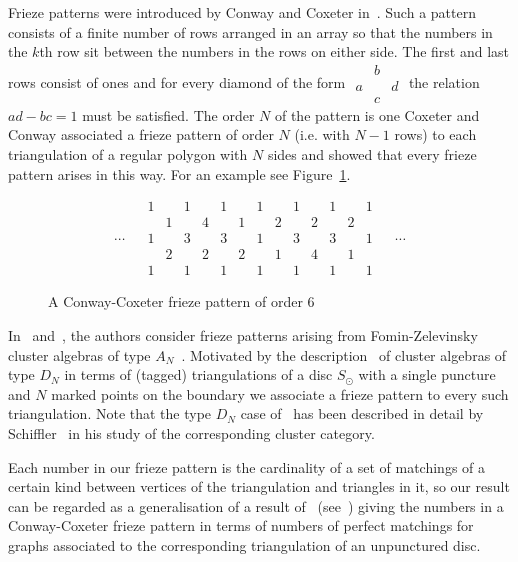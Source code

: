 \documentclass[a4paper]{amsart}
\begin{document}
Frieze patterns were introduced by Conway and Coxeter
in~\cite{cc73a,cc73b}. Such a pattern consists of a finite number of rows
arranged in an array so that the numbers in the $k$th row sit between
the numbers in the rows on either side. The first and last rows consist
of ones and for every diamond of the form
$\begin{array}{rcl}
 & b \\
a & & d \\
 & c
\end{array}$
the relation $ad-bc=1$ must be satisfied. The order $N$ of the pattern is one
Coxeter and Conway associated a frieze pattern of order $N$
(i.e. with $N-1$ rows) to each triangulation of a regular polygon with
$N$ sides and showed that every frieze pattern arises in this way. For
an example see Figure~\ref{fig:friezeexample}.

\begin{figure}[htp]
$$
\begin{array}{ccccccccccccccccc}
&& 1 && 1 && 1 && 1 && 1 && 1 && 1 \\
&&& 1 && 4 && 1 && 2 && 2 && 2 & \\
\cdots && 1 && 3 && 3 && 1 && 3 && 3 && 1 && \cdots \\
&&& 2 && 2 && 2 && 1 && 4 && 1 & \\
&& 1 && 1 && 1 && 1 && 1 && 1 && 1
\end{array}
$$
\caption{A Conway-Coxeter frieze pattern of order $6$}
\label{fig:friezeexample}
\end{figure}

In~\cite{calderochapoton06} and~\cite{propp}, the authors consider
frieze patterns arising from Fomin-Zelevinsky cluster algebras of
type $A_N$~\cite{fominzelevinsky02,fominzelevinsky03}. Motivated by the
description~\cite{fst06} of cluster algebras of type $D_N$ in terms of
(tagged) triangulations of a disc $S_{\odot}$ with a single puncture and
$N$ marked points on the boundary we associate a frieze pattern to every
such triangulation. Note that the type $D_N$ case
of~\cite{fst06} has been described in detail by Schiffler~\cite{schiffler06}
in his study of the corresponding cluster category.

Each number in our frieze pattern is the cardinality of a
set of matchings of a certain kind between vertices of the triangulation
and triangles in it, so our result can be regarded as a generalisation
of a result of~\cite{carrollprice} (see~\cite{propp}) giving the
numbers in a Conway-Coxeter frieze pattern in terms of numbers of
perfect matchings for graphs associated to the corresponding triangulation
of an unpunctured disc.
\end{document}
